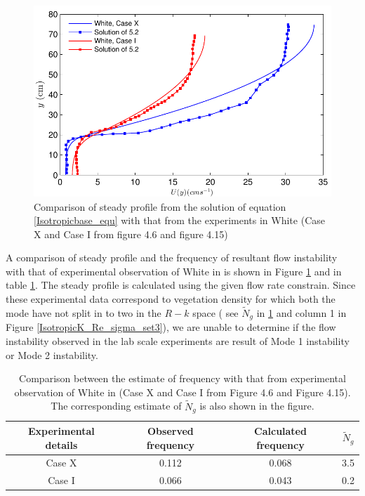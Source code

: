 \documentclass[12pt]{report}   %
\newcommand{\Ndg}{\tilde{N}_g}
\begin{document}
\begin{figure}
 \includegraphics{GrassBaseWhiteIsotropic}
 \caption{Comparison of steady profile from the solution of equation \eqref{Isotropicbase_equ} with that from the experiments in White \cite{White06} (Case X and Case I from figure 4.6 and figure 4.15) }
 \label{GrassBaseWhiteIsotropic}
\end{figure}

A comparison of steady profile and the frequency of resultant flow instability with that of experimental observation of White in \cite{White06} is shown in Figure \ref{GrassBaseWhiteIsotropic} and in table \ref{tab:FrequencyComparisonIsotropicDrag}. The steady profile is calculated using the given flow rate constrain. Since these experimental data correspond to vegetation density for which both the mode have not split in to two in the $R-k$ space ( see $\Ndg$ in \ref{tab:FrequencyComparisonIsotropicDrag} and column 1 in Figure \ref{IsotropicK_Re_sigma_set3}), we are unable to determine if the flow instability observed in the lab scale experiments are result of Mode 1 instability or Mode 2 instability.
\begin{centering} 
\begin{table}
\begin{tabular}{|c|c|c|c|}
\hline
  Experimental details & Observed frequency & Calculated frequency & $\Ndg$ \\ 
\hline
 Case X &    0.112 & 0.068 &  3.5  \\
 Case I &    0.066 & 0.043 &  0.2 \\


\hline
\end{tabular}
 \caption{Comparison between the estimate of frequency with that from experimental observation of White in \cite{White06} (Case X and Case I from Figure 4.6 and Figure 4.15). The corresponding estimate of $\Ndg$ is also shown in the figure. }
 \label{tab:FrequencyComparisonIsotropicDrag}
\end{table}
\end{centering}
\end{document}
